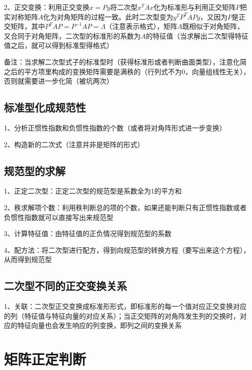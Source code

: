2、正交变换：利用正交变换$ x=Py $将二次型$ x^TAx $化为标准形与利用正交矩阵$ P $把实对称矩阵$ A $化为对角矩阵的过程一致。此时二次型变为$ y^TP^TAPy $，又因为$ P $是正交矩阵，其中$ P^TAP =P^{-1}AP= \Lambda $（注意表示格式），矩阵$ A $既相似于对角矩阵，又合同于对角矩阵，二次型的标准形的系数为$ A $的特征值（当求解出二次型得特征值之后，就可以得到标准型得格式）

备注：当求解二次型式子的标准型时（获得标准形或者判断曲面类型），注意化简之后的平方项里构成的变换矩阵需要是满秩的（行列式不为0，向量组线性无关），否则就需要进一步化简（被坑两次）



\subsection{标准型化成规范性}

1、分析正惯性指数和负惯性指数的个数（或者将对角阵形式进一步变换）

2、构造新的二次式（注意并非是矩阵的形式）



\subsection{规范型的求解}

1、正定二次型：正定二次型的规范型是系数全为1的平方和

2、秩求解项个数：利用秩判断总的项的个数，如果还能判断只有正惯性指数或者负惯性指数就可以直接写出来规范型

3、计算特征值：由特征值的正负情况得到规范型的系数

4、配方法：将二次型进行配方，得到向规范型的转换方程（要写出来这个方程），从而得到规范型



\subsection{二次型不同的正交变换关系}

1、关联：二次型正交变换成标准形形式，即标准形的每一个值对应正交变换对应的列（特征值与特征向量的对应关系）；当正交矩阵的对角阵发生列的交换时，对应的特征向量也会发生响应的列变换，即列之间的变换关系

\section{矩阵正定判断}



